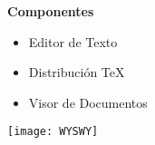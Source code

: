 \begin{frame}
    \textbf{Componentes}
        \begin{itemize}
            \item Editor de Texto
            \item Distribuci\'on \TeX{}
            \item Visor de Documentos
        \end{itemize}
        \vspace{2.0cm}
        \texttt{[image: WYSWY]}
\end{frame}
